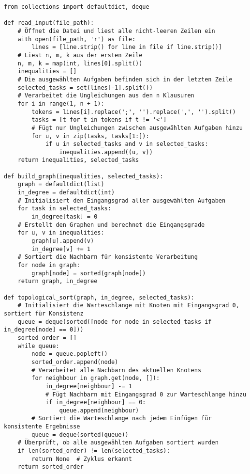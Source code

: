 \documentclass{article}
\begin{document}
\begin{lstlisting}[style=custompython]
from collections import defaultdict, deque

def read_input(file_path):
    # Öffnet die Datei und liest alle nicht-leeren Zeilen ein
    with open(file_path, 'r') as file:
        lines = [line.strip() for line in file if line.strip()]
    # Liest n, m, k aus der ersten Zeile
    n, m, k = map(int, lines[0].split())
    inequalities = []
    # Die ausgewählten Aufgaben befinden sich in der letzten Zeile
    selected_tasks = set(lines[-1].split())
    # Verarbeitet die Ungleichungen aus den n Klausuren
    for i in range(1, n + 1):
        tokens = lines[i].replace(';', '').replace(',', '').split()
        tasks = [t for t in tokens if t != '<']
        # Fügt nur Ungleichungen zwischen ausgewählten Aufgaben hinzu
        for u, v in zip(tasks, tasks[1:]):
            if u in selected_tasks and v in selected_tasks:
                inequalities.append((u, v))
    return inequalities, selected_tasks

def build_graph(inequalities, selected_tasks):
    graph = defaultdict(list)
    in_degree = defaultdict(int)
    # Initialisiert den Eingangsgrad aller ausgewählten Aufgaben
    for task in selected_tasks:
        in_degree[task] = 0
    # Erstellt den Graphen und berechnet die Eingangsgrade
    for u, v in inequalities:
        graph[u].append(v)
        in_degree[v] += 1
    # Sortiert die Nachbarn für konsistente Verarbeitung
    for node in graph:
        graph[node] = sorted(graph[node])
    return graph, in_degree

def topological_sort(graph, in_degree, selected_tasks):
    # Initialisiert die Warteschlange mit Knoten mit Eingangsgrad 0, sortiert für Konsistenz
    queue = deque(sorted([node for node in selected_tasks if in_degree[node] == 0]))
    sorted_order = []
    while queue:
        node = queue.popleft()
        sorted_order.append(node)
        # Verarbeitet alle Nachbarn des aktuellen Knotens
        for neighbour in graph.get(node, []):
            in_degree[neighbour] -= 1
            # Fügt Nachbarn mit Eingangsgrad 0 zur Warteschlange hinzu
            if in_degree[neighbour] == 0:
                queue.append(neighbour)
        # Sortiert die Warteschlange nach jedem Einfügen für konsistente Ergebnisse
        queue = deque(sorted(queue))
    # Überprüft, ob alle ausgewählten Aufgaben sortiert wurden
    if len(sorted_order) != len(selected_tasks):
        return None  # Zyklus erkannt
    return sorted_order


\end{lstlisting}
\end{document}
